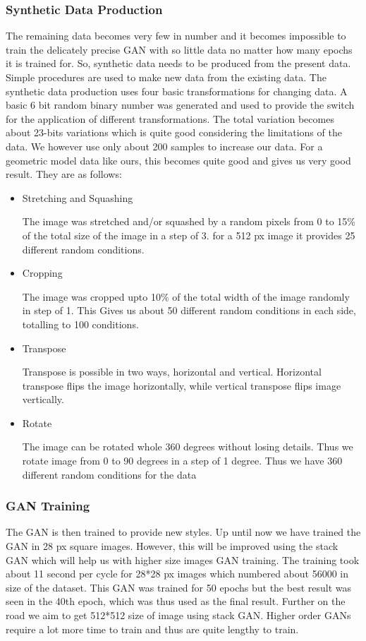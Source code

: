 \documentclass{article}
\begin{document}
    \subsubsection{Synthetic Data Production}
    The remaining data becomes very few in number and it becomes impossible to train the delicately precise GAN with so little data no matter how many epochs it is trained for. So, synthetic data needs to be produced from the present data. Simple procedures are used to make new data from the existing data. The synthetic data production uses four basic transformations for changing data. A basic 6 bit random binary number was generated and used to provide the switch for the application of different transformations. The total variation becomes about 23-bits variations which is quite good considering the limitations of the data. We however use only about 200 samples to increase our data. For a geometric model data like ours, this becomes quite good and gives us very good result.
    They are as follows:
    \begin{itemize}
	\item Stretching and Squashing
	
	The image was stretched and/or squashed by a random pixels from 0 to 15\% of the total size of the image in a step of 3. for a 512 px image it provides 25 different random conditions.
	\item Cropping
	
	The image was cropped upto 10\% of the total width of the image randomly in step of 1. This Gives us about 50 different random conditions in each side, totalling to 100 conditions.
	\item Transpose
	
	Transpose is possible in two ways, horizontal and vertical. Horizontal transpose flips the image horizontally, while vertical transpose flips image vertically.
	\item Rotate
	
	The image can be rotated whole 360 degrees without losing details. Thus we rotate image from 0 to 90 degrees in a step of 1 degree. Thus we have 360 different random conditions for the data
    \end{itemize}
    
    \subsubsection{GAN Training}
    The GAN is then trained to provide new styles. Up until now we have trained the GAN in 28 px square images. However, this will be improved using the stack GAN which will help us with higher size images GAN training. The training took about 11 second per cycle for 28*28 px images which numbered about 56000 in size of the dataset. This GAN was trained for 50 epochs but the best result was seen in the 40th epoch, which was thus used as the final result. Further on the road we aim to get 512*512 size of image using stack GAN. Higher order GANs require a lot more time to train and thus are quite lengthy to train.
\end{document}
